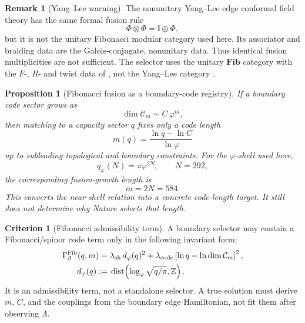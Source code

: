 \documentclass[aps,prd,reprint,nofootinbib,superscriptaddress,floatfix]{revtex4-2}
\numberwithin{equation}{section}
\theoremstyle{definition}
\newtheorem{criterion}{Criterion}[section]
\newtheorem{remark}{Remark}[section]
\theoremstyle{plain}
\newtheorem{proposition}{Proposition}[section]
\begin{document}
\begin{remark}[Yang--Lee warning]
The nonunitary Yang--Lee edge conformal field theory has the same formal
fusion rule
\begin{equation}
\Phi\otimes\Phi=\mathbb I\oplus\Phi,
\end{equation}
but it is not the unitary Fibonacci modular category used here.  Its
associator and braiding data are the Galois-conjugate, nonunitary data.
Thus identical fusion multiplicities are not sufficient.  The selector
uses the unitary \(\mathbf{Fib}\) category with the \(F\)-, \(R\)- and
twist data of , not the Yang--Lee category
\cite{Cardy1985,NayakEtAl2008}.
\end{remark}

\begin{proposition}[Fibonacci fusion as a boundary-code registry]
If a boundary code sector grows as
\begin{equation}
\dim\mathcal C_m \sim C\,\varphi^m,
\end{equation}
then matching to a capacity sector \(q\) fixes only a code length
\begin{equation}
m(q)=\frac{\ln q-\ln C}{\ln\varphi}
\end{equation}
up to subleading topological and boundary constraints.  For the
\(\varphi\)-shell used here,
\begin{equation}
q_\varphi(N)=\pi\varphi^{2N},
\qquad
N=292,
\end{equation}
the corresponding fusion-growth length is
\begin{equation}
m=2N=584 .
\end{equation}
This converts the near shell relation into a concrete code-length
target.  It still does not determine why Nature selects that length.
\end{proposition}

\begin{criterion}[Fibonacci admissibility term]
A boundary selector may contain a Fibonacci/spinor code term only in the
following invariant form:
\begin{align}
\Gamma_{\partial}^{\rm Fib}(q,m)
={}&
\lambda_{\rm sh}\,
d_\varphi(q)^2
+\lambda_{\rm code}
\left[
\ln q-\ln\dim\mathcal C_m
\right]^2,\\
d_\varphi(q)
:={}&
\operatorname{dist}\!\left(
\log_\varphi\sqrt{q/\pi},\mathbb Z
\right).
\end{align}
It is an admissibility term, not a standalone selector.  A true solution
must derive \(m\), \(C\), and the couplings from the boundary edge
Hamiltonian, not fit them after observing \(\Lambda\).
\end{criterion}
\end{document}
